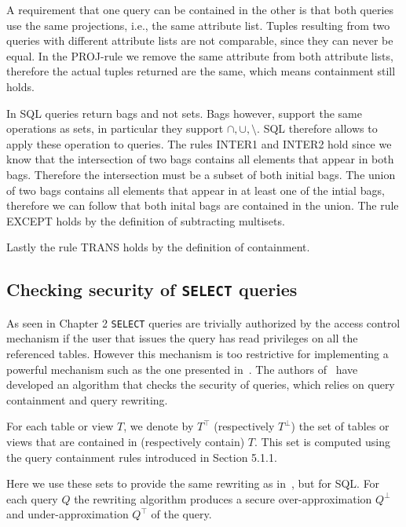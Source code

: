 A requirement that one query can be contained in the other is that both queries use the same projections, i.e., the same attribute list.
%
Tuples resulting from two queries with different attribute lists are not comparable, since they can never be equal.
%
In the PROJ-rule we remove the same attribute from both attribute lists, therefore the actual tuples returned are the same, which means containment still holds.

In SQL queries return bags and not sets.
%
Bags however, support the same operations as sets, in particular they support $\cap, \cup, \setminus$.
%
SQL therefore allows to apply these operation to queries.
%
The rules INTER1 and INTER2 hold since we know that the intersection of two bags contains all elements that appear in both bags.
%
Therefore the intersection must be a subset of both initial bags.
%
The union of two bags contains all elements that appear in at least one of the intial bags, therefore we can follow that both inital bags are contained in the union.
%
The rule EXCEPT holds by the definition of subtracting multisets.

Lastly the rule TRANS holds by the definition of containment.

\FloatBarrier
\subsection{Checking security of \texttt{SELECT} queries}

As seen in Chapter 2 \texttt{SELECT} queries are trivially authorized by the access control mechanism if the user that issues the query has read privileges on all the referenced tables.
%
However this mechanism is too restrictive for implementing a powerful mechanism such as the one presented in~\cite{guarnieri2016strong}.
%
The authors of~\cite{guarnieri2016strong} have developed an algorithm that checks the security of queries, which relies on query containment and query rewriting. 

For each table or view $T$, we denote by $T^\top$ (respectively $T^\bot$) the set of tables or views that are contained in (respectively contain) $T$.
%
This set is computed using the query containment rules introduced in Section 5.1.1.
%

Here we use these sets to provide the same rewriting as in~\cite{guarnieri2016strong}, but for SQL.
%
For each query $Q$ the rewriting algorithm produces a secure over-approximation $Q^\bot$ and under-approximation $Q^\top$ of the query.

